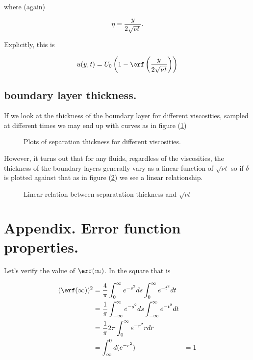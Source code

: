 where (again)

\begin{equation}\label{eqn:continuumL16:610}
\eta = \frac{y}{2 \sqrt{\nu t}}.
\end{equation}

Explicitly, this is

\begin{equation}\label{eqn:continuumL16:590b}
u(y, t) = U_0 \left(1 - \erf\left(\frac{y}{2 \sqrt{\nu t}}\right) \right)
\end{equation}

\subsection{boundary layer thickness.}

If we look at the thickness of the boundary layer for different viscosities, sampled at different times we may end up with curves as in figure (\ref{fig:continuumL16:continuumL16Fig4a})

\begin{figure}[htp]
   \centering
   \def\svgwidth{0.3\columnwidth}
   
   \caption{Plots of separation thickness for different viscosities.}\label{fig:continuumL16:continuumL16Fig4a}
\end{figure}

However, it turns out that for any fluids, regardless of the viscosities, the thickness of the boundary layers generally vary as a linear function of $\sqrt{\nu t}$ so if $\delta$ is plotted against that as in figure (\ref{fig:continuumL16:continuumL16Fig4b}) we see a linear relationship.

\begin{figure}[htp]
   \centering
   \def\svgwidth{0.3\columnwidth}
   
   \caption{Linear relation between separatation thickness and $\sqrt{\nu t}$}\label{fig:continuumL16:continuumL16Fig4b}
\end{figure}

\section{Appendix.  Error function properties.}

Let's verify the value of $\erf(\infty)$.  In the square that is

\begin{align*}
(\erf(\infty))^2 
&=
\frac{4}{\pi} 
\int_0^\infty e^{-s^2} ds
\int_0^\infty e^{-t^2} dt \\
&=
\frac{1}{\pi} 
\int_{-\infty}^\infty e^{-s^2} ds
\int_{-\infty}^\infty e^{-t^2} dt \\
&=
\frac{1}{\pi} 2 \pi
\int_{0}^\infty e^{-r^2} r dr \\
&=
\int_\infty^0 d( e^{-r^2} )
&= 1
\end{align*}

\EndArticle
